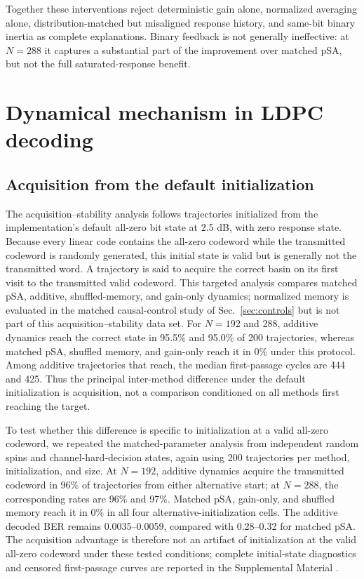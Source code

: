 \documentclass[aps,prapplied,reprint,superscriptaddress,longbibliography,floatfix]{revtex4-2}
\newcommand{\psa}{pSA}
\begin{document}
Together these interventions reject deterministic gain alone, normalized averaging alone, distribution-matched but misaligned response history, and same-bit binary inertia as complete explanations.  Binary feedback is not generally ineffective: at $N=288$ it captures a substantial part of the improvement over matched \psa{}, but not the full saturated-response benefit.

\section{Dynamical mechanism in LDPC decoding}
\label{sec:mechanism}

\subsection{Acquisition from the default initialization}

The acquisition--stability analysis follows trajectories initialized from the implementation's default all-zero bit state at 2.5 dB, with zero response state.  Because every linear code contains the all-zero codeword while the transmitted codeword is randomly generated, this initial state is valid but is generally not the transmitted word.  A trajectory is said to acquire the correct basin on its first visit to the transmitted valid codeword.  This targeted analysis compares matched \psa{}, additive, shuffled-memory, and gain-only dynamics; normalized memory is evaluated in the matched causal-control study of Sec.~\ref{sec:controls} but is not part of this acquisition--stability data set.  For $N=192$ and 288, additive dynamics reach the correct state in 95.5\% and 95.0\% of 200 trajectories, whereas matched \psa{}, shuffled memory, and gain-only reach it in 0\% under this protocol.  Among additive trajectories that reach, the median first-passage cycles are 444 and 425.  Thus the principal inter-method difference under the default initialization is acquisition, not a comparison conditioned on all methods first reaching the target.

To test whether this difference is specific to initialization at a valid all-zero codeword, we repeated the matched-parameter analysis from independent random spins and channel-hard-decision states, again using 200 trajectories per method, initialization, and size.  At $N=192$, additive dynamics acquire the transmitted codeword in 96\% of trajectories from either alternative start; at $N=288$, the corresponding rates are 96\% and 97\%.  Matched \psa{}, gain-only, and shuffled memory reach it in 0\% in all four alternative-initialization cells.  The additive decoded BER remains 0.0035--0.0059, compared with 0.28--0.32 for matched \psa{}.  The acquisition advantage is therefore not an artifact of initialization at the valid all-zero codeword under these tested conditions; complete initial-state diagnostics and censored first-passage curves are reported in the Supplemental Material \cite{supplement}.
\end{document}
